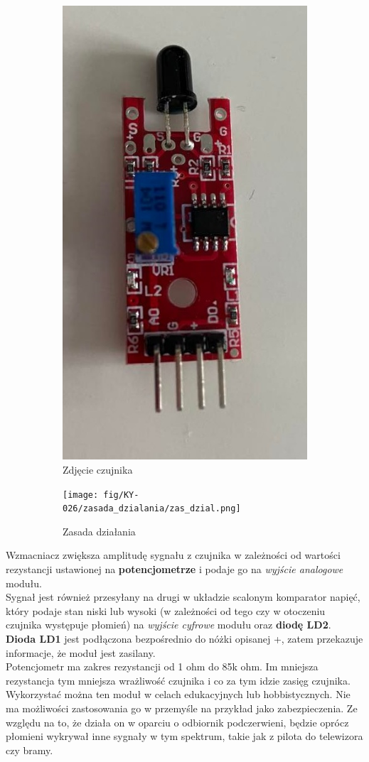 \documentclass[11pt, a4paper]{article}
\begin{document}
\vspace{0.5cm}
\begin{figure}[h]
\centering
\begin{subfigure}{.4\textwidth}
  \centering
  \includegraphics[width=.4\linewidth]{fig/KY-026/zdj_modułu/zdj2.jpg}
  \caption{Zdjęcie czujnika}
  \label{fig:sub1}
\end{subfigure}%
\begin{subfigure}{.4\textwidth}
  \centering
    \texttt{[image: fig/KY-026/zasada\_dzialania/zas\_dzial.png]}
      \caption{Zasada działania}
  \label{zd}
\end{subfigure}
\caption{}
\label{fig:test}
\end{figure}
\vspace{0.5cm}

Wzmacniacz zwiększa amplitudę sygnału z czujnika w zależności od wartości rezystancji ustawionej na \textbf{potencjometrze} i podaje go na \textit{wyjście analogowe} modułu.\\
Sygnał jest również przesyłany na drugi w układzie scalonym komparator napięć, który podaje stan niski lub wysoki (w zależności od tego czy w otoczeniu czujnika występuje płomień) na \textit{wyjście cyfrowe} modułu oraz \textbf{diodę LD2}. \textbf{Dioda LD1} jest podłączona bezpośrednio do nóżki opisanej +, zatem przekazuje informacje, że moduł jest zasilany. \\
Potencjometr ma zakres rezystancji od 1 ohm do 85k ohm. Im mniejsza rezystancja tym mniejsza wrażliwość czujnika i co za tym idzie zasięg czujnika.  \\
Wykorzystać można ten moduł w celach edukacyjnych lub hobbistycznych. Nie ma możliwości zastosowania go w przemyśle na przykład jako zabezpieczenia. Ze względu na to, że działa on w oparciu o odbiornik podczerwieni, będzie oprócz płomieni wykrywał inne sygnały w tym spektrum, takie jak z pilota do telewizora czy bramy. 
\end{document}
